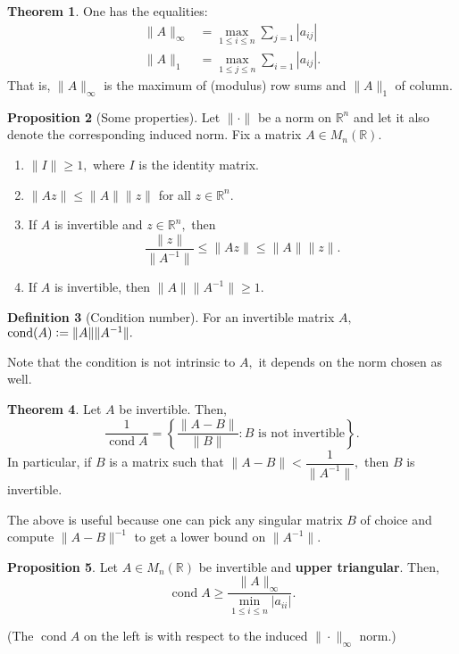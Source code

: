 \documentclass[12pt]{article}
\theoremstyle{definition}
\newtheorem{thm}{Theorem}
\newtheorem{prop}[thm]{Proposition}
\newtheorem{defn}[thm]{Definition}
\newcommand{\md}[1]{{\left\lvert #1 \right\lvert}}
\DeclareMathOperator{\cond}{cond}
\begin{document}
\begin{thm}
	One has the equalities:
	\begin{align*} 
		\|A\|_\infty &= \max_{1 \le i \le n}\sum_{j = 1}\md{a_{ij}}\\
		\|A\|_1 &= \max_{1 \le j \le n}\sum_{i = 1}\md{a_{ij}}.
	\end{align*}
	That is, $\|A\|_\infty$ is the maximum of (modulus) row sums and $\|A\|_1$ of column.
\end{thm}

\begin{prop}[Some properties]
	Let $\|\cdot\|$ be a norm on $\mathbb{R}^n$ and let it also denote the corresponding induced norm. Fix a matrix $A \in M_n(\mathbb{R}).$
	\begin{enumerate}
		\item $\|I\| \ge 1,$ where $I$ is the identity matrix.
		\item $\|Az\| \le \|A\|\|z\|$ for all $z \in \mathbb{R}^n.$
		\item If $A$ is invertible and $z \in \mathbb{R}^n,$ then
		\begin{equation*} 
			\frac{\|z\|}{\|A^{-1}\|} \le \|Az\| \le \|A\| \|z\|.
		\end{equation*}
		\item If $A$ is invertible, then $\|A\|\|A^{-1}\| \ge 1.$
	\end{enumerate}
\end{prop}

\begin{defn}[Condition number]
	For an invertible matrix $A,$ $\cond(A) \vcentcolon= \|A\|\|A^{-1}\|.$
\end{defn}
Note that the condition is not intrinsic to $A,$ it depends on the norm chosen as well.
\begin{thm}
	Let $A$ be invertible. Then,
	\begin{equation*} 
		\frac{1}{\cond A} = \left\{\frac{\|A - B\|}{\|B\|} : B \text{ is not invertible}\right\}.
	\end{equation*}
	In particular, if $B$ is a matrix such that $\|A - B\| < \dfrac{1}{\|A^{-1}\|},$ then $B$ is invertible.
\end{thm}
The above is useful because one can pick any singular matrix $B$ of choice and compute $\|A - B\|^{-1}$ to get a lower bound on $\|A^{-1}\|.$
\begin{prop}
	Let $A \in M_n(\mathbb{R})$ be invertible and \textbf{upper triangular}. Then,
	\begin{equation*} 
		\cond A \ge \frac{\|A\|_{\infty}}{\min_{1 \le i \le n}\md{a_{ii}}}.
	\end{equation*}
\end{prop}
(The $\cond A$ on the left is with respect to the induced $\|\cdot\|_\infty$ norm.)
\end{document}
